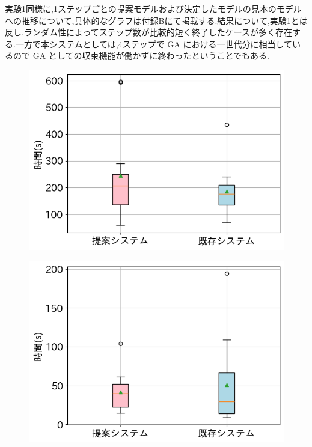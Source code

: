 実験1同様に,1ステップごとの提案モデルおよび決定したモデルの見本のモデルへの推移について,具体的なグラフは\hyperref[appendix:gaChange]{付録B}にて掲載する.結果について,実験1とは反し,ランダム性によってステップ数が比較的短く終了したケースが多く存在する.一方で本システムとしては,4ステップで GA における一世代分に相当しているので GA としての収束機能が働かずに終わったということでもある.

\begin{figure}[h]
 \begin{minipage}[b]{0.48\linewidth}
  \centering
  \includegraphics[scale=0.4]{./imgs/result/sofaAllTime.png}
        \label{fig:exp2AllTime}
 \end{minipage}
 \begin{minipage}[b]{0.48\linewidth}
  \centering
  \includegraphics[scale=0.4]{./imgs/result/sofaStepTime.png}

\end{minipage}
\end{figure}
